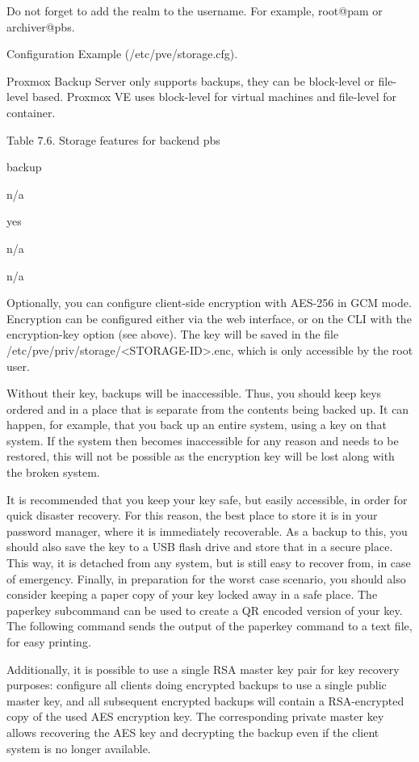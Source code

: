 Do not forget to add the realm to the username. For example, root@pam or archiver@pbs.

Configuration Example (/etc/pve/storage.cfg).

Proxmox Backup Server only supports backups, they can be block-level or file-level based. Proxmox VE uses block-level for virtual machines and file-level for container.

Table 7.6. Storage features for backend pbs

backup

n/a

yes

n/a

n/a

Optionally, you can configure client-side encryption with AES-256 in GCM mode. Encryption can be configured either via the web interface, or on the CLI with the encryption-key option (see above). The key will be saved in the file /etc/pve/priv/storage/<STORAGE-ID>.enc, which is only accessible by the root user.

Without their key, backups will be inaccessible. Thus, you should keep keys ordered and in a place that is separate from the contents being backed up. It can happen, for example, that you back up an entire system, using a key on that system. If the system then becomes inaccessible for any reason and needs to be restored, this will not be possible as the encryption key will be lost along with the broken system.

It is recommended that you keep your key safe, but easily accessible, in order for quick disaster recovery. For this reason, the best place to store it is in your password manager, where it is immediately recoverable. As a backup to this, you should also save the key to a USB flash drive and store that in a secure place. This way, it is detached from any system, but is still easy to recover from, in case of emergency. Finally, in preparation for the worst case scenario, you should also consider keeping a paper copy of your key locked away in a safe place. The paperkey subcommand can be used to create a QR encoded version of your key. The following command sends the output of the paperkey command to a text file, for easy printing.

Additionally, it is possible to use a single RSA master key pair for key recovery purposes: configure all clients doing encrypted backups to use a single public master key, and all subsequent encrypted backups will contain a RSA-encrypted copy of the used AES encryption key. The corresponding private master key allows recovering the AES key and decrypting the backup even if the client system is no longer available.

